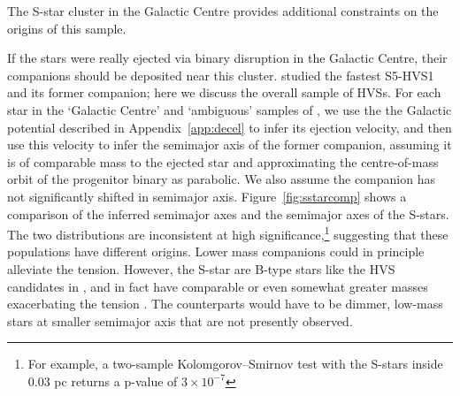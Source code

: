 \documentclass[fleqn,usenatbib]{mnras}
\begin{document}
The S-star cluster in the Galactic Centre provides additional constraints on the origins of this sample.

If the stars were really ejected via binary disruption in the Galactic Centre, their companions should be deposited near this cluster.
\cite{wenbinlu+2020} studied the fastest S5-HVS1 and its former companion; here we discuss the overall sample of HVSs. 
 For each star in the `Galactic Centre' and `ambiguous' samples of \citet{warren_brown+2018}, we use the the Galactic potential described in Appendix~\ref{app:decel} to infer its ejection velocity, and then use this velocity to infer the semimajor axis of the former companion, assuming it is of comparable mass to the ejected star and approximating the centre-of-mass orbit of the progenitor binary as parabolic.
  We also assume the companion has not significantly shifted in semimajor axis. Figure~\ref{fig:sstarcomp} shows a comparison of the inferred semimajor axes and the semimajor axes of the S-stars. The two distributions are inconsistent at high significance,\footnote{For example, a two-sample Kolomgorov--Smirnov test with the S-stars inside 0.03 pc returns a p-value of $3\times 10^{-7}$} suggesting that these populations have different origins. Lower mass companions could in principle alleviate the tension. However, the S-star are B-type stars like the HVS candidates in \citet{warren_brown+2018}, and in fact have comparable or even somewhat greater masses exacerbating the tension \citep{habibi+2017,cai+2018}. The counterparts would have to be dimmer, low-mass stars at smaller semimajor axis that are not presently observed.  

  
\end{document}
